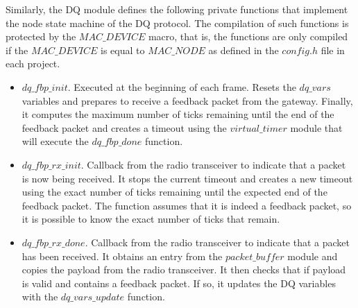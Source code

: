 Similarly, the DQ module defines the following private functions that implement the node state machine of the DQ protocol. The compilation of such functions is protected by the $MAC\_DEVICE$ macro, that is, the functions are only compiled if the $MAC\_DEVICE$ is equal to $MAC\_NODE$ as defined in the $config.h$ file in each project.
\begin{itemize}
\item $dq\_fbp\_init$. Executed at the beginning of each frame. Resets the $dq\_vars$ variables and prepares to receive a feedback packet from the gateway. Finally, it computes the maximum number of ticks remaining until the end of the feedback packet and creates a timeout using the $virtual\_timer$ module that will execute the $dq\_fbp\_done$ function.
\item $dq\_fbp\_rx\_init$. Callback from the radio transceiver to indicate that a packet is now being received. It stops the current timeout and creates a new timeout using the exact number of ticks remaining until the expected end of the feedback packet. The function assumes that it is indeed a feedback packet, so it is possible to know the exact number of ticks that remain.
\item $dq\_fbp\_rx\_done$. Callback from the radio transceiver to indicate that a packet has been received. It obtains an entry from the $packet\_buffer$ module and copies the payload from the radio transceiver. It then checks that if payload is valid and contains a feedback packet. If so, it updates the DQ variables with the $dq\_vars\_update$ function.


\end{itemize}
